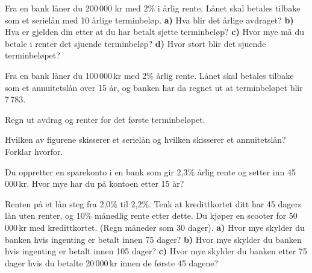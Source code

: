 \nes

Fra en bank låner du 200\,000 kr med 2\% i årlig rente. Lånet skal betales tilbake som et serielån med 10 årlige terminbeløp. \os
\textbf{a)} Hva blir det årlige avdraget?\os
\textbf{b)} Hva er gjelden din etter at du har betalt sjette terminbeløp?\os
\textbf{c)} Hvor mye må du betale i renter det sjuende terminbeløp?\os
\textbf{d)} Hvor stort blir det sjuende terminbeløpet?\os 

Fra en bank låner du 100\,000\,kr med 2\% årlig rente. Lånet skal betales tilbake som et annuitetslån over 15 år, og banken har da regnet ut at terminbeløpet blir 7\,783.\os

Regn ut avdrag og renter for det første terminbeløpet.

Hvilken av figurene skisserer et serielån og hvilken skisserer et annuitetslån? Forklar hvorfor.
\begin{figure}	\centering
	\;
\end{figure}

Du oppretter en sparekonto i en bank som gir 2,3\% årlig rente og setter inn 45\,000\,kr. Hvor mye har du på kontoen etter 15 år?

Renten på et lån steg fra 2,0\% til 2,2\%.
\newpage
{}
Tenk at kredittkortet ditt har 45 dagers lån uten renter, og 10\% månedlig rente etter dette. Du kjøper en scooter for 50\,000\,kr med kredittkortet. (Regn måneder som 30 dager).\os
\textbf{a)} Hvor mye skylder du banken hvis ingenting er betalt innen 75 dager?\os
\textbf{b)} Hvor mye skylder du banken hvis ingenting er betalt innen 105 dager?\os 
\textbf{c)} Hvor mye skylder du banken etter 75 dager hvis du betalte 20\,000\,kr innen de første 45 dagene?



